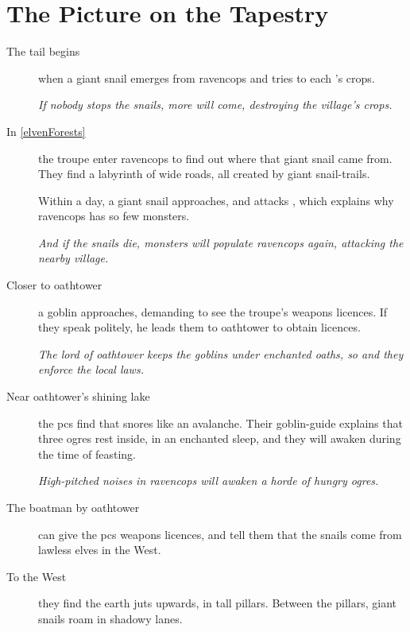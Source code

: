 \enchantedMap[b]

\section*{The Picture on the Tapestry}

\begin{multicols}{2}

\begin{description}
  \item[The tail begins]
  when a giant snail emerges from \gls{ravencops} and tries to each 's crops.

  \textit{If nobody stops the snails, more will come, destroying the \gls{village}'s crops.}

  \item[In \autoref{elvenForests}]
  the troupe enter \gls{ravencops} to find out where that giant snail came from.
  They find a labyrinth of wide roads, all created by giant snail-trails.

  Within a day, a giant snail approaches, and attacks , which explains why \gls{ravencops} has so few monsters.

  \textit{And if the snails die, \glspl{monster} will populate \gls{ravencops} again, attacking the nearby \gls{village}.}

  \item[Closer to \gls{oathtower}]
  a goblin approaches, demanding to see the troupe's weapons licences.
  If they speak politely, he leads them to \gls{oathtower} to obtain licences.

  \textit{The lord of \gls{oathtower} keeps the goblins under enchanted oaths, so and they enforce the local laws.}

  \item[Near \gls{oathtower}'s shining lake]
  the \glspl{pc} find  that snores like an avalanche.
  Their goblin-guide explains that three \glspl{ogre} rest inside, in an enchanted sleep, and they will awaken during the time of feasting.

  \textit{High-pitched noises in \gls{ravencops} will awaken a horde of hungry \glspl{ogre}.}

  \item[The boatman by \gls{oathtower}]
  can give the \glspl{pc} weapons licences, and tell them that the snails come from lawless elves in the West.

  \item[To the West]
  they find the earth juts upwards, in tall pillars.
  Between the pillars, giant snails roam in shadowy lanes.


\end{description}
\end{multicols}
